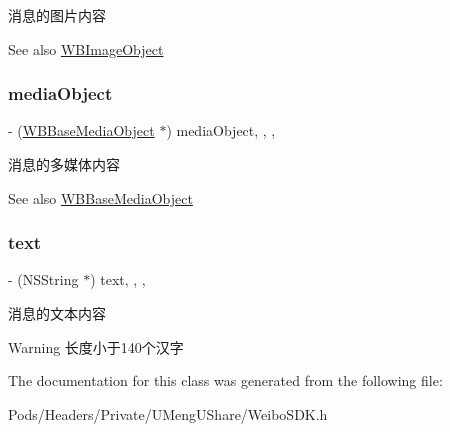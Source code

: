 消息的图片内容

\begin{DoxySeeAlso}{See also}
\mbox{\hyperlink{interface_w_b_image_object}{W\+B\+Image\+Object}} 
\end{DoxySeeAlso}
\mbox{\label{interface_w_b_message_object_af36d6cdb8586404dfcfe8cca06e750ed}} 
\subsubsection{\texorpdfstring{media\+Object}{mediaObject}}
{\footnotesize\ttfamily -\/ (\mbox{\hyperlink{interface_w_b_base_media_object}{W\+B\+Base\+Media\+Object}} $\ast$) media\+Object\hspace{0.3cm}{\ttfamily [read]}, {\ttfamily [write]}, {\ttfamily [nonatomic]}, {\ttfamily [strong]}}

消息的多媒体内容

\begin{DoxySeeAlso}{See also}
\mbox{\hyperlink{interface_w_b_base_media_object}{W\+B\+Base\+Media\+Object}} 
\end{DoxySeeAlso}
\mbox{\label{interface_w_b_message_object_ac71697733c16d0f8ee135eb2c9637e10}} 
\subsubsection{\texorpdfstring{text}{text}}
{\footnotesize\ttfamily -\/ (N\+S\+String $\ast$) text\hspace{0.3cm}{\ttfamily [read]}, {\ttfamily [write]}, {\ttfamily [nonatomic]}, {\ttfamily [strong]}}

消息的文本内容

\begin{DoxyWarning}{Warning}
长度小于140个汉字 
\end{DoxyWarning}


The documentation for this class was generated from the following file\+:\begin{DoxyCompactItemize}
\item 
Pods/\+Headers/\+Private/\+U\+Meng\+U\+Share/Weibo\+S\+D\+K.\+h\end{DoxyCompactItemize}
